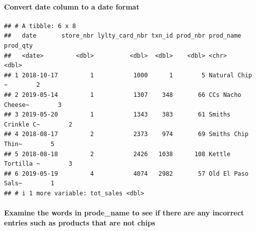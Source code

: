 \documentclass[
]{article}
\newenvironment{Shaded}{\begin{snugshade}}{\end{snugshade}}
\newcommand{\AttributeTok}[1]{\textcolor[rgb]{0.13,0.29,0.53}{#1}}
\newcommand{\FunctionTok}[1]{\textcolor[rgb]{0.13,0.29,0.53}{\textbf{#1}}}
\newcommand{\NormalTok}[1]{#1}
\newcommand{\OtherTok}[1]{\textcolor[rgb]{0.56,0.35,0.01}{#1}}
\newcommand{\SpecialCharTok}[1]{\textcolor[rgb]{0.81,0.36,0.00}{\textbf{#1}}}
\newcommand{\StringTok}[1]{\textcolor[rgb]{0.31,0.60,0.02}{#1}}
\begin{document}
\hypertarget{convert-date-column-to-a-date-format}{%
\paragraph{Convert date column to a date
format}\label{convert-date-column-to-a-date-format}}

\begin{Shaded}
\end{Shaded}

\begin{verbatim}
## # A tibble: 6 x 8
##   date       store_nbr lylty_card_nbr txn_id prod_nbr prod_name         prod_qty
##   <date>         <dbl>          <dbl>  <dbl>    <dbl> <chr>                <dbl>
## 1 2018-10-17         1           1000      1        5 Natural Chip    ~        2
## 2 2019-05-14         1           1307    348       66 CCs Nacho Cheese~        3
## 3 2019-05-20         1           1343    383       61 Smiths Crinkle C~        2
## 4 2018-08-17         2           2373    974       69 Smiths Chip Thin~        5
## 5 2018-08-18         2           2426   1038      108 Kettle Tortilla ~        3
## 6 2019-05-19         4           4074   2982       57 Old El Paso Sals~        1
## # i 1 more variable: tot_sales <dbl>
\end{verbatim}

\hypertarget{examine-the-words-in-prode_name-to-see-if-there-are-any-incorrect-entries-such-as-products-that-are-not-chips}{%
\paragraph{Examine the words in prode\_name to see if there are any
incorrect entries such as products that are not
chips}\label{examine-the-words-in-prode_name-to-see-if-there-are-any-incorrect-entries-such-as-products-that-are-not-chips}}

\begin{Shaded}
\end{Shaded}
\end{document}
